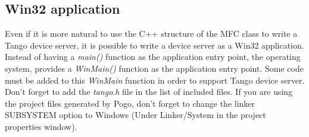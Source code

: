 \subsection{Win32 application}

Even if it is more natural to use the C++ structure of the MFC class
to write a Tango device server, it is possible to write a device server
as a Win32 application. Instead of having a \emph{main()}
function as the application entry point, the operating system, provides
a \emph{WinMain()} function as the application entry point. Some code
must be added to this \emph{WinMain} function in order
to support Tango device server. Don't forget to add the \emph{tango}.\emph{h}
file in the list of included files. If you are using the project files
generated by Pogo, don't forget to change the linker SUBSYSTEM option
to \textquotedbl{}Windows\textquotedbl{} (Under Linker/System in the
project properties window).


